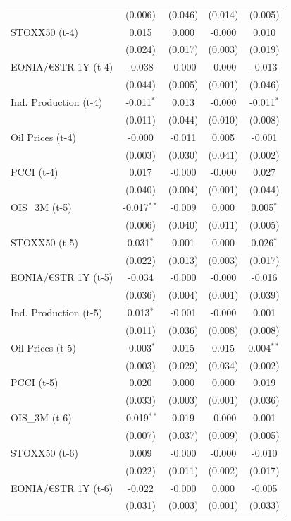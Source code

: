 \begin{longtable}[t]{lcccc}
 & (0.006) & (0.046) & (0.014) & (0.005)\\
STOXX50 (t-4) & 0.015 & 0.000 & -0.000 & 0.010\\
 & (0.024) & (0.017) & (0.003) & (0.019)\\
EONIA/€STR 1Y (t-4) & -0.038 & -0.000 & -0.000 & -0.013\\
 & (0.044) & (0.005) & (0.001) & (0.046)\\
Ind. Production (t-4) & -0.011$^{*}$ & 0.013 & -0.000 & -0.011$^{*}$\\
 & (0.011) & (0.044) & (0.010) & (0.008)\\
Oil Prices (t-4) & -0.000 & -0.011 & 0.005 & -0.001\\
 & (0.003) & (0.030) & (0.041) & (0.002)\\
PCCI (t-4) & 0.017 & -0.000 & -0.000 & 0.027\\
 & (0.040) & (0.004) & (0.001) & (0.044)\\
OIS\_3M (t-5) & -0.017$^{**}$ & -0.009 & 0.000 & 0.005$^{*}$\\
 & (0.006) & (0.040) & (0.011) & (0.005)\\
STOXX50 (t-5) & 0.031$^{*}$ & 0.001 & 0.000 & 0.026$^{*}$\\
 & (0.022) & (0.013) & (0.003) & (0.017)\\
EONIA/€STR 1Y (t-5) & -0.034 & -0.000 & -0.000 & -0.016\\
 & (0.036) & (0.004) & (0.001) & (0.039)\\
Ind. Production (t-5) & 0.013$^{*}$ & -0.001 & -0.000 & 0.001\\
 & (0.011) & (0.036) & (0.008) & (0.008)\\
Oil Prices (t-5) & -0.003$^{*}$ & 0.015 & 0.015 & 0.004$^{**}$\\
 & (0.003) & (0.029) & (0.034) & (0.002)\\
PCCI (t-5) & 0.020 & 0.000 & 0.000 & 0.019\\
 & (0.033) & (0.003) & (0.001) & (0.036)\\
OIS\_3M (t-6) & -0.019$^{**}$ & 0.019 & -0.000 & 0.001\\
 & (0.007) & (0.037) & (0.009) & (0.005)\\
STOXX50 (t-6) & 0.009 & -0.000 & -0.000 & -0.010\\
 & (0.022) & (0.011) & (0.002) & (0.017)\\
EONIA/€STR 1Y (t-6) & -0.022 & -0.000 & 0.000 & -0.005\\
 & (0.031) & (0.003) & (0.001) & (0.033)\\

\end{longtable}
